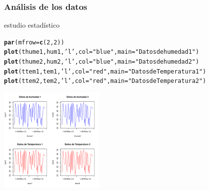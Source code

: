 \documentclass[10pt]{beamer}\usepackage[]{graphicx}\usepackage[]{color}
\makeatletter
\newcommand{\hlnum}[1]{\textcolor[rgb]{0.686,0.059,0.569}{#1}}%
\newcommand{\hlstr}[1]{\textcolor[rgb]{0.192,0.494,0.8}{#1}}%
\newcommand{\hlstd}[1]{\textcolor[rgb]{0.345,0.345,0.345}{#1}}%
\newcommand{\hlkwc}[1]{\textcolor[rgb]{0.333,0.667,0.333}{#1}}%
\newcommand{\hlkwd}[1]{\textcolor[rgb]{0.737,0.353,0.396}{\textbf{#1}}}%
\newenvironment{kframe}{%
 \def\at@end@of@kframe{}%
 \ifinner\ifhmode%
  \def\at@end@of@kframe{\end{minipage}}%
  \begin{minipage}{\columnwidth}%
 \fi\fi%
 \def\FrameCommand##1{\hskip\@totalleftmargin \hskip-\fboxsep
 \colorbox{shadecolor}{##1}\hskip-\fboxsep
     \hskip-\linewidth \hskip-\@totalleftmargin \hskip\columnwidth}%
 \MakeFramed {\advance\hsize-\width
   \@totalleftmargin\z@ \linewidth\hsize
   \@setminipage}}%
 {\par\unskip\endMakeFramed%
 \at@end@of@kframe}
\newenvironment{knitrout}{}{} %
\makeatother
\begin{document}
\begin{frame}[fragile]
	\frametitle{Análisis de los datos}
	estudio estadístico
	\begin{center}
\begin{knitrout}
\color{fgcolor}\begin{kframe}
\begin{alltt}
\hlkwd{par}\hlstd{(}\hlkwc{mfrow}\hlstd{=}\hlkwd{c}\hlstd{(}\hlnum{2}\hlstd{,}\hlnum{2}\hlstd{))}
\hlkwd{plot}\hlstd{(thume1,hum1,}\hlstr{'l'}\hlstd{,}\hlkwc{col} \hlstd{=} \hlstr{"blue"}\hlstd{,}\hlkwc{main} \hlstd{=} \hlstr{"Datos de humedad 1"}\hlstd{)}
\hlkwd{plot}\hlstd{(thume2,hum2,}\hlstr{'l'}\hlstd{,}\hlkwc{col} \hlstd{=} \hlstr{"blue"}\hlstd{,}\hlkwc{main} \hlstd{=} \hlstr{"Datos de humedad 2"}\hlstd{)}
\hlkwd{plot}\hlstd{(ttem1,tem1,}\hlstr{'l'}\hlstd{,}\hlkwc{col} \hlstd{=} \hlstr{"red"}\hlstd{,}\hlkwc{main} \hlstd{=} \hlstr{"Datos de Temperatura 1"}\hlstd{)}
\hlkwd{plot}\hlstd{(ttem2,tem2,}\hlstr{'l'}\hlstd{,}\hlkwc{col} \hlstd{=} \hlstr{"red"}\hlstd{,}\hlkwc{main} \hlstd{=} \hlstr{"Datos de Temperatura 2"}\hlstd{)}
\end{alltt}
\end{kframe}
\includegraphics[width=2in]{figure/unnamed-chunk-8-1} 

\end{knitrout}
	\end{center}
	
\end{frame}
\end{document}
